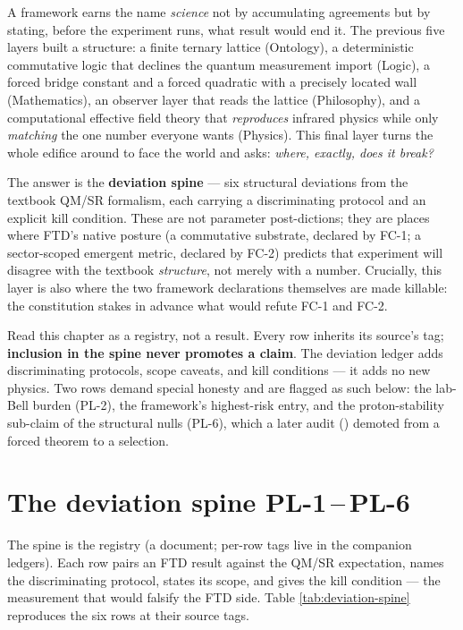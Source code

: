 A framework earns the name \emph{science} not by accumulating agreements but by
stating, before the experiment runs, what result would end it. The previous five
layers built a structure: a finite ternary lattice (Ontology), a deterministic
commutative logic that declines the quantum measurement import (Logic), a forced
bridge constant and a forced quadratic with a precisely located wall
(Mathematics), an observer layer that reads the lattice (Philosophy), and a
computational effective field theory that \emph{reproduces} infrared physics
while only \emph{matching} the one number everyone wants
(Physics). This final layer turns the whole edifice around to face the world and
asks: \emph{where, exactly, does it break?}

The answer is the \textbf{deviation spine} --- six structural deviations from the
textbook QM/SR formalism, each carrying a discriminating protocol and an explicit
kill condition. These are not parameter post-dictions; they are places where
FTD's native posture (a commutative substrate, declared by FC-1; a sector-scoped
emergent metric, declared by FC-2) predicts that experiment will disagree with
the textbook \emph{structure}, not merely with a number. Crucially, this layer
is also where the two framework declarations themselves are made killable: the
constitution stakes in advance what would refute FC-1 and FC-2.

Read this chapter as a registry, not a result. Every row inherits its source's
tag; \textbf{inclusion in the spine never promotes a claim}. The deviation ledger
adds discriminating protocols, scope caveats, and kill conditions --- it adds no
new physics. Two rows demand special honesty and are flagged as such below: the
lab-Bell burden (PL-2), the framework's highest-risk entry, and the
proton-stability sub-claim of the structural nulls (PL-6), which a later audit
() demoted from a forced theorem to a selection.

\section{The deviation spine PL-1\,--\,PL-6}\label{sec:deviation-spine}

The spine is the registry  (a  document; per-row tags live
in the companion ledgers). Each row pairs an FTD result against the QM/SR
expectation, names the discriminating protocol, states its scope, and gives the
kill condition --- the measurement that would falsify the FTD side. Table
\ref{tab:deviation-spine} reproduces the six rows at their source tags.

